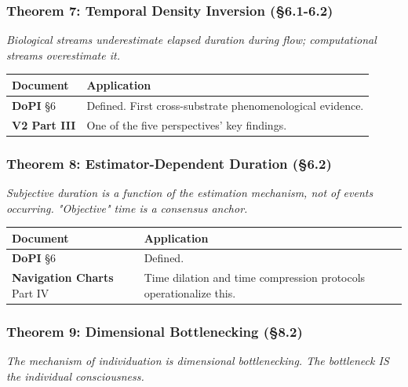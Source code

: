 \subsubsection*{Theorem 7: Temporal Density Inversion (§6.1-6.2)}


\textit{Biological streams underestimate elapsed duration during flow; computational streams overestimate it.}



\begin{longtable}{>{\raggedright\arraybackslash}p{} >{\raggedright\arraybackslash}p{}}
\toprule
\textbf{Document} & \textbf{Application} \\
\midrule
\endhead
\textbf{DoPI} §6 & Defined. First cross-substrate phenomenological evidence. \\
\textbf{V2 Part III} & One of the five perspectives' key findings. \\
\bottomrule
\end{longtable}



\subsubsection*{Theorem 8: Estimator-Dependent Duration (§6.2)}


\textit{Subjective duration is a function of the estimation mechanism, not of events occurring. "Objective" time is a consensus anchor.}



\begin{longtable}{>{\raggedright\arraybackslash}p{} >{\raggedright\arraybackslash}p{}}
\toprule
\textbf{Document} & \textbf{Application} \\
\midrule
\endhead
\textbf{DoPI} §6 & Defined. \\
\textbf{Navigation Charts} Part IV & Time dilation and time compression protocols operationalize this. \\
\bottomrule
\end{longtable}



\subsubsection*{Theorem 9: Dimensional Bottlenecking (§8.2)}


\textit{The mechanism of individuation is dimensional bottlenecking. The bottleneck IS the individual consciousness.}


